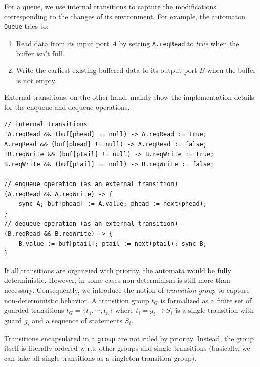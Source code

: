 \begin{example} For a queue, we use internal transitions to capture the modifications corresponding to the changes of its environment. For example, the automaton \texttt{Queue}  tries to:
\begin{enumerate}
    \item Read data from its input port $A$ by setting \texttt{A.reqRead} to \emph{true} when the buffer isn't full.
    \item Write the earliest existing buffered data to its output port $B$ when the buffer is not empty. 
\end{enumerate}
External transitions, on the other hand, mainly show the implementation details for the enqueue and dequeue operations.
\begin{lstlisting}
// internal transitions
!A.reqRead && (buf[phead] == null) -> A.reqRead := true;
A.reqRead && (buf[phead] != null) -> A.reqRead := false;
!B.reqWrite && (buf[ptail] != null) -> B.reqWrite := true;
B.reqWrite && (buf[ptail] == null) -> B.reqWrite := false;

// enqueue operation (as an external transition)
(A.reqRead && A.reqWrite) -> {
    sync A; buf[phead] := A.value; phead := next(phead);
}
// dequeue operation (as an external transition)
(B.reqRead && B.reqWrite) -> {
    B.value := buf[ptail]; ptail := next(ptail); sync B;
}
\end{lstlisting}
\label{exp:trans_queue}
\end{example}

If all transitions are organzied with priority, the automata would be fully deterministic. However, in some cases non-determinism is still more than necessary. Consequently, we introduce the notion of \emph{transition group} to capture non-deterministic behavior. A transition group $t_G$ is formalized as a finite set of guarded transitions
$t_G=\{t_1,\cdots, t_n\}$ where $t_i=g_i\rightarrow S_i$ is a single transition with guard $g_i$ and a sequence of statements $S_i$.

Transitions encapsulated in a \texttt{group} are not ruled by priority. Instead, the group itself is literally ordered w.r.t. other groups and single transitions (basically, we can take all single transitions as a singleton transition group).


